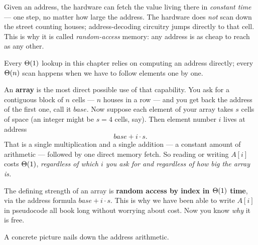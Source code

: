 \begin{intuitionbox}
Given an address, the hardware can fetch the value living there in \emph{constant time} --- one step, no matter how large the address. The hardware does \emph{not} scan down the street counting houses; address-decoding circuitry jumps directly to that cell. This is why it is called \emph{random-access} memory: any address is as cheap to reach as any other.

Every $\Theta(1)$ lookup in this chapter relies on computing an address directly; every $\Theta(n)$ scan happens when we have to follow elements one by one.
\end{intuitionbox}

An \textbf{array} is the most direct possible use of that capability. You ask for a contiguous block of $n$ cells --- $n$ houses in a row --- and you get back the address of the first one, call it $base$. Now suppose each element of your array takes $s$ cells of space (an integer might be $s=4$ cells, say). Then element number $i$ lives at address
\[
  base + i \cdot s.
\]
That is a single multiplication and a single addition --- a constant amount of arithmetic --- followed by one direct memory fetch. So reading or writing $A[i]$ costs $\Theta(1)$, \emph{regardless of which $i$ you ask for and regardless of how big the array is.}

\begin{focusbox}
The defining strength of an array is \textbf{random access by index in $\Theta(1)$ time}, via the address formula $base + i\cdot s$. This is why we have been able to write $A[i]$ in pseudocode all book long without worrying about cost. Now you know \emph{why} it is free.
\end{focusbox}

A concrete picture nails down the address arithmetic.

\begin{center}
\end{center}

